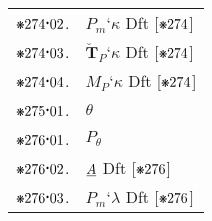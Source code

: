 \documentclass[12pt,openany,leqno,twocolumn]{book}
\newcommand{\pmast}{\text{\resizebox{!}{.75\height}{\ding{107}}}} %
\newcommand{\pmcdot}{\text{\raisebox{.05cm}{$\boldsymbol{\cdot}$}}} %
\newcommand{\pmbreve}[1]{\mathbf{\breve{\text{$#1$}}}}
\newcommand{\pma}{\emph{A}} %
\newcommand{\pmsfclsm}[2]{#1_m\textbf{`}#2} %
\newcommand{\pmsfclsp}[2]{\pmbreve{#1}_P\textbf{`}{#2}} %
\newcommand{\pmsfclsmp}[1]{M_P\textbf{`}{#1}} %
\newcommand{\pmcser}{\theta} %
\newcommand{\pmcsercl}[1]{#1_\pmcser} %
\begin{document}
\begin{tabular}{l l}
	$\pmast274\pmcdot02$. & $\pmsfclsm{P}{\kappa}$ \hspace{3.4ex} Dft [\(\pmast274\)] \\
	$\pmast274\pmcdot03$. & $\pmsfclsp{T}{\kappa}$ \hspace{3.7ex} Dft [\(\pmast274\)] \\
	$\pmast274\pmcdot04$. & $\pmsfclsmp{\kappa}$ \hspace{3ex} Dft [\(\pmast274\)] \\
	$\pmast275\pmcdot01$. & $\pmcser$ \\
	$\pmast276\pmcdot01$. & $\pmcsercl{P}$ \\
	$\pmast276\pmcdot02$. & $\pma$ \hspace{7.3ex} Dft [\(\pmast276\)] \\
	$\pmast276\pmcdot03$. & $\pmsfclsm{P}{\lambda}$ \hspace{4ex} Dft [\(\pmast276\)] 
\end{tabular}
\end{document}
